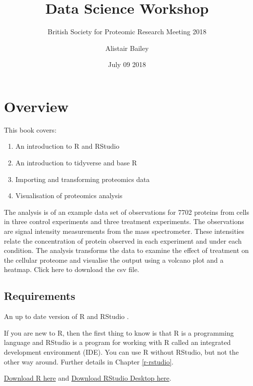 \documentclass[12pt,]{book}
\title{Data Science Workshop}
\subtitle{British Society for Proteomic Research Meeting 2018}
\author{Alistair Bailey}
\date{July 09 2018}
\providecommand{\tightlist}{%
  \setlength{\itemsep}{0pt}\setlength{\parskip}{0pt}}
\theoremstyle{definition}
\theoremstyle{definition}
\theoremstyle{definition}
\theoremstyle{remark}
\begin{document}
\maketitle

{
\setcounter{tocdepth}{1}
\tableofcontents
}
\chapter*{Overview}\label{overview}

This book covers:

\begin{enumerate}
\def\labelenumi{\arabic{enumi}.}
\tightlist
\item
  An introduction to R and RStudio
\item
  An introduction to tidyverse and base R
\item
  Importing and transforming proteomics data
\item
  Visualisation of proteomics analysis
\end{enumerate}

The analysis is of an example data set of observations for 7702 proteins
from cells in three control experiments and three treatment experiments.
The observations are signal intensity measurements from the mass
spectrometer. These intensities relate the concentration of protein
observed in each experiment and under each condition. The analysis
transforms the data to examine the effect of treatment on the cellular
proteome and visualise the output using a volcano plot and a heatmap.
Click here to download the csv file.

\section*{Requirements}\label{requirements}

An up to date version of R \citep{R-base} and RStudio
\citep{rstudioteam2018}.

If you are new to R, then the first thing to know is that R is a
programming language and RStudio is a program for working with R called
an integrated development environment (IDE). You can use R without
RStudio, but not the other way around. Further details in Chapter
\ref{r-rstudio}.

\href{https://cran.r-project.org/}{Download R here} and
\href{https://www.rstudio.com/products/rstudio/download/}{Download
RStudio Desktop here}.
\end{document}

